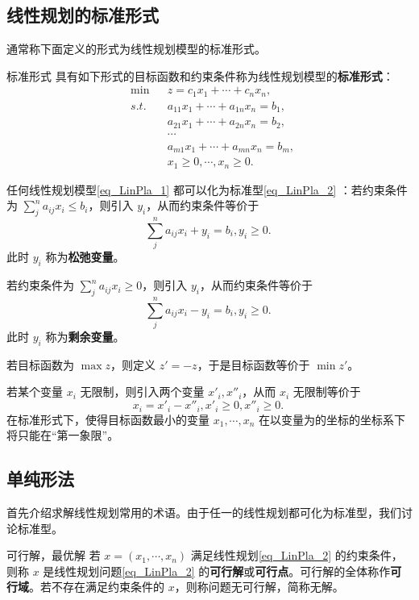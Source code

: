 \subsection{线性规划的标准形式}
通常称下面定义的形式为线性规划模型的标准形式。
\begin{definition}{标准形式}
具有如下形式的目标函数和约束条件称为线性规划模型的\textbf{标准形式}：
\begin{equation}\label{eq_LinPla_2}
\begin{aligned}
&\min  &&z=c_1x_1+\cdots +c_nx_n,\\
&s.t. &&a_{11}x_1+\cdots+a_{1n}x_n=b_1,\\
&&&a_{21}x_1+\cdots+a_{2n}x_n=b_2,\\
&&&\cdots\\
&&&a_{m1}x_1+\cdots+a_{mn}x_n=b_m,\\
&&&x_1\geq0,\cdots,x_n\geq0.
\end{aligned}~
\end{equation}

\end{definition}
任何线性规划模型\autoref{eq_LinPla_1} 都可以化为标准型\autoref{eq_LinPla_2} ：若约束条件为 $\sum_{j}^na_{ij} x_i\leq b_i$，则引入 $y_{i}$，从而约束条件等价于
\begin{equation}
\sum_{j}^na_{ij} x_i+y_i= b_i,y_i\geq 0.~
\end{equation}
此时 $y_i$ 称为\textbf{松弛变量}。

若约束条件为 $\sum_{j}^na_{ij} x_i\geq 0$，则引入 $y_{i}$，从而约束条件等价于
\begin{equation}
\sum_{j}^na_{ij} x_i-y_i= b_i,y_i\geq 0.~
\end{equation}
此时 $y_i$ 称为\textbf{剩余变量}。

若目标函数为 $\max z$，则定义 $z'=-z$，于是目标函数等价于 $\min z'$。

若某个变量 $x_i$ 无限制，则引入两个变量 $x'_i,x''_i$，从而 $x_i$ 无限制等价于 
\begin{equation}
x_i=x'_i-x''_i,x'_i\geq0,x''_i\geq0.~
\end{equation}
在标准形式下，使得目标函数最小的变量 $x_1,\cdots,x_n$ 在以变量为的坐标的坐标系下将只能在“第一象限”。


\subsection{单纯形法}

首先介绍求解线性规划常用的术语。由于任一的线性规划都可化为标准型，我们讨论标准型。

\begin{definition}{可行解，最优解}
若 $x=(x_1,\cdots,x_n)$ 满足线性规划\autoref{eq_LinPla_2} 的约束条件，则称 $x$ 是线性规划问题\autoref{eq_LinPla_2} 的\textbf{可行解}或\textbf{可行点}。可行解的全体称作\textbf{可行域}。若不存在满足约束条件的 $x$，则称问题无可行解，简称无解。
\end{definition}








